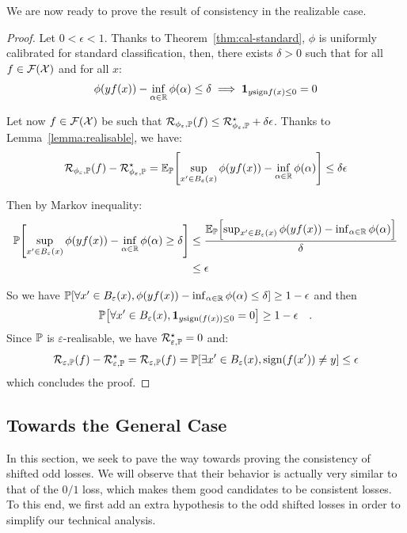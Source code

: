 We are now ready to prove the result of consistency in the realizable case.
\begin{proof}
Let $0<\epsilon<1$. Thanks to Theorem~\ref{thm:cal-standard}, $\phi$ is uniformly calibrated for standard classification, then, there exists $\delta>0$ such that for all $f\in\mathcal{F}(\mathcal{X})$ and for all $x$:
\begin{align*}
    \phi(yf(x))-\inf_{\alpha\in\mathbb{R}}\phi(\alpha)\leq \delta \implies \mathbf{1}_{y\text{sign}f(x)\leq 0} = 0
\end{align*}

Let now $f\in\mathcal{F}(\mathcal{X})$ be such that  $\mathcal{R}_{\phi_\varepsilon,\mathbb{P}}(f)\leq \mathcal{R}_{\phi_\varepsilon,\mathbb{P}}^\star+\delta\epsilon$. Thanks to Lemma~\ref{lemma:realisable},  we have:
\begin{align*}
\risk_{\phi_\varepsilon,\PP}(f)- \risk_{\phi_\varepsilon,\PP}^\star = \EE_{\PP}\left[\sup_{x'\in B_\varepsilon(x)}\phi(yf(x))-\inf_{\alpha \in \RR} \phi(\alpha)\right]\leq\delta\epsilon
\end{align*}

Then by Markov inequality:
\begin{align*}
    \PP\left[\sup_{x'\in B_\varepsilon(x)}\phi(yf(x))-\inf_{\alpha\in\RR}\phi(\alpha)\geq\delta\right]&\leq\frac{\EE_{\PP}\left[\sup_{x'\in B_\varepsilon(x)}\phi(yf(x))-\inf_{\alpha\in\RR}\phi(\alpha)\right]}{\delta}\\
    &\leq \epsilon
\end{align*}

So we have $\PP\left[\forall x'\in B_\varepsilon(x),\phi(yf(x))-\inf_{\alpha\in\RR}\phi(\alpha)\leq\delta\right]\geq1-\epsilon$ and then 
\begin{align*}
    \PP\left[\forall x'\in B_\varepsilon(x),\mathbf{1}_{y\text{sign}(f(x))\leq 0} = 0\right]\geq1-\epsilon\quad.
\end{align*}
 Since $\mathbb{P}$ is $\varepsilon$-realisable, we have $\mathcal{R}_{\varepsilon,\mathbb{P}}^\star=0$ and:
\begin{align*}
        \risk_{\varepsilon,\PP}(f)- \risk_{\varepsilon,\PP}^\star =  \risk_{\varepsilon,\PP}(f) =\PP\left[\exists x'\in B_\varepsilon(x), \text{sign}(f(x'))\neq y\right]\leq \epsilon
\end{align*}
which concludes the proof.
\end{proof}



\subsection{Towards the General Case}
\label{sec:consis-gen}
In this section, we seek to pave the way towards proving the consistency of shifted odd losses. We will observe that their behavior is actually very similar to that of the $0/1$ loss, which makes them good candidates to be consistent losses. To this end, we first add an extra hypothesis to the odd shifted losses in order to simplify our technical analysis.


